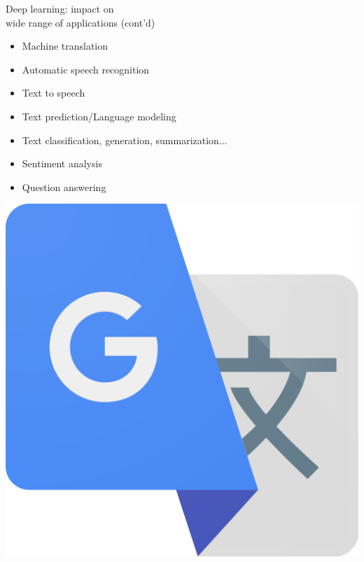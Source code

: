 \begin{frame}{Deep learning: impact on \\wide range of applications (cont'd)}

\begin{itemize}
\item Machine translation
\item Automatic speech recognition
\item Text to speech
\item Text prediction/Language modeling
\item Text classification, generation, summarization...
\item Sentiment analysis
\item Question answering
\end{itemize}
\hspace{-8mm}
\begin{minipage}{0.2\linewidth}
  \begin{center}
    \includegraphics[height=0.3\textheight]{figures/applications/g-translate.png}
  \end{center}
\end{minipage}
\begin{minipage}{0.35\linewidth}
  \begin{center}

\end{center}
\end{minipage}
\end{frame}
